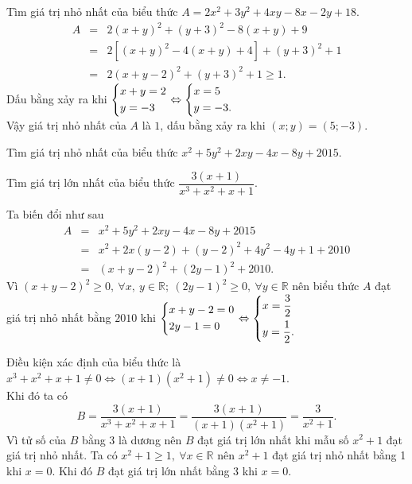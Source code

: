 \begin{vn}
Tìm giá trị nhỏ nhất của biểu thức $A=2x^2+3y^2+4xy-8x-2y+18$.
	\loigiai
	{
	{\allowdisplaybreaks\begin{eqnarray*}
		A&=& 2(x+y)^2 + (y+3)^2 - 8(x+y) + 9\\
		&=& 2\left[(x+y)^2 - 4(x+y) + 4 \right] + (y+3)^2+1 \\
		&=& 2(x+y-2)^2 + (y+3)^2+1 \ge 1.
	\end{eqnarray*}}
	Dấu bằng xảy ra khi $\left\{\begin{aligned}& x+y=2 \\ & y=-3\end{aligned}\right. \Leftrightarrow \left\{\begin{aligned}&x=5 \\ & y=-3.\end{aligned}\right.$\\
	Vậy giá trị nhỏ nhất của $A$ là $1$, dấu bằng xảy ra khi $(x;y)=(5;-3)$.
	}
\end{vn}
\begin{vn}
	\begin{listEX}
		\item Tìm giá trị nhỏ nhất của biểu thức $x^2+5y^2+2xy-4x-8y+2015$. 
		\item Tìm giá trị lớn nhất của biểu thức $\dfrac{3(x+1)}{x^3+x^2+x+1}$.
	\end{listEX}
	\loigiai
	{
	 \begin{listEX}
	 	\item Ta biến đổi như sau
	 	{\allowdisplaybreaks\begin{eqnarray*}
	 		A &=& x^2+5y^2+2xy-4x-8y+2015\\
	 		&=& x^2+2x(y-2)+(y-2)^2+4y^2-4y+1+2010\\
	 		&=& (x+y-2)^2+(2y-1)^2+2010.
	 	\end{eqnarray*}}	
	 	Vì $(x+y-2)^2 \geq 0,\ \forall x,\ y\in\mathbb{R};\ (2y-1)^2\geq0,\ \forall y \in\mathbb{R}$ nên biểu thức $A$ đạt giá trị nhỏ nhất bằng $2010$ khi $\left\{\begin{aligned}&x+y-2=0\\&2y-1=0\end{aligned}\right. \Leftrightarrow \left\{\begin{aligned}&x= \dfrac{3}{2}\\ &y= \dfrac{1}{2}.\end{aligned}\right.$
	 	\item Điều kiện xác định của biểu thức là $x^3+x^2+x+1\ne 0 \Leftrightarrow(x+1)(x^2+1)\ne 0 \Leftrightarrow x\ne-1$.\\
	 	Khi đó ta có \[B = \dfrac{3(x+1)}{x^3+x^2+x+1}= \dfrac{3(x+1)}{(x+1)(x^2+1)} = \dfrac{3}{x^2+1}.\]
	 	Vì tử số của $B$ bằng 3 là dương nên $B$ đạt giá trị lớn nhất khi mẫu số $x^2+1$ đạt giá trị nhỏ nhất. Ta có $x^2+1\geq1,\ \forall x\in\mathbb{R}$ nên $x^2+1$ đạt giá trị nhỏ nhất bằng 1 khi $x=0$. Khi đó $B$ đạt giá trị lớn nhất bằng 3 khi $x=0$.
	 \end{listEX}
	}
\end{vn}
